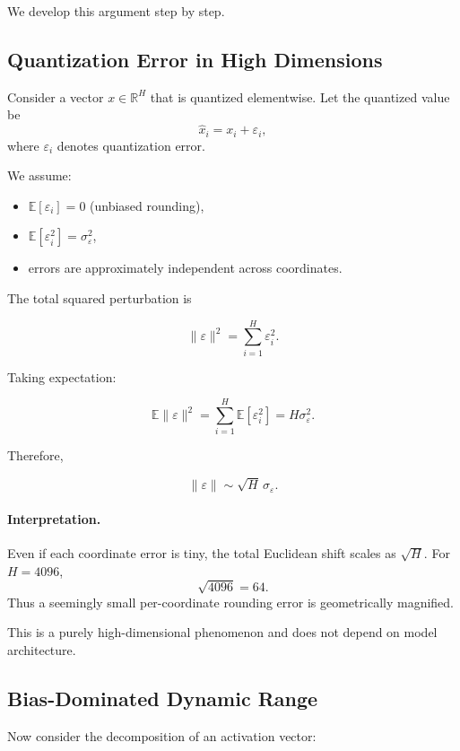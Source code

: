 We develop this argument step by step.

\subsection{Quantization Error in High Dimensions}

Consider a vector $x \in \mathbb{R}^H$ that is quantized elementwise.
Let the quantized value be
\[
\hat{x}_i = x_i + \varepsilon_i,
\]
where $\varepsilon_i$ denotes quantization error.

We assume:
\begin{itemize}
\item $\mathbb{E}[\varepsilon_i] = 0$ (unbiased rounding),
\item $\mathbb{E}[\varepsilon_i^2] = \sigma_\varepsilon^2$,
\item errors are approximately independent across coordinates.
\end{itemize}

The total squared perturbation is

\[
\|\varepsilon\|^2 = \sum_{i=1}^H \varepsilon_i^2.
\]

Taking expectation:

\[
\mathbb{E}\|\varepsilon\|^2
=
\sum_{i=1}^H \mathbb{E}[\varepsilon_i^2]
=
H \sigma_\varepsilon^2.
\]

Therefore,

\[
\|\varepsilon\| \sim \sqrt{H} \, \sigma_\varepsilon.
\]

\paragraph{Interpretation.}

Even if each coordinate error is tiny, the total Euclidean shift scales as $\sqrt{H}$.
For $H = 4096$,
\[
\sqrt{4096} = 64.
\]
Thus a seemingly small per-coordinate rounding error is geometrically magnified.

This is a purely high-dimensional phenomenon and does not depend on model architecture.

\subsection{Bias-Dominated Dynamic Range}

Now consider the decomposition of an activation vector:

